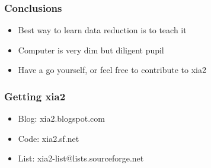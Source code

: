\documentclass[slides,compress]{beamer}
\begin{document}
\begin{frame}
\frametitle{Conclusions}
\begin{itemize}
\item{Best way to learn data reduction is to teach it}
\item{Computer is very dim but diligent pupil}
\item{Have a go yourself, or feel free to contribute to xia2}
\end{itemize}
\end{frame}

\begin{frame}
\frametitle{Getting xia2}
\begin{itemize}
\item{Blog: xia2.blogspot.com}
\item{Code: xia2.sf.net}
\item{List: xia2-list@lists.sourceforge.net}
\end{itemize}
\end{frame}
\end{document}
